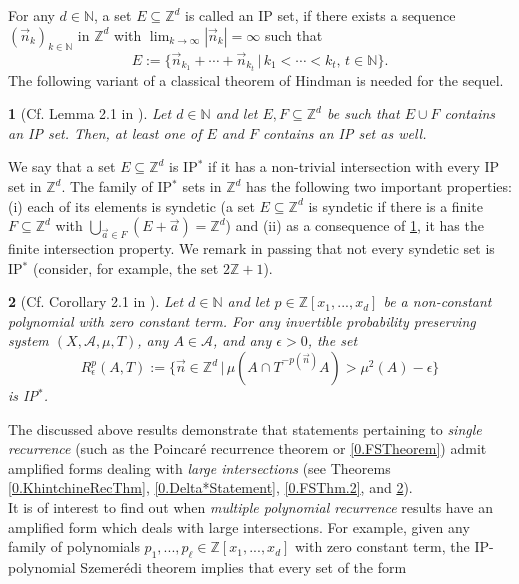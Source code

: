 \documentclass[11pt,american,preprint]{elsarticle}
\numberwithin{equation}{section}
\theoremstyle{plain}
\newtheorem{thm}{\protect\theoremname}[section]
\theoremstyle{plain*}
\theoremstyle{plain}
\theoremstyle{plain*}
\theoremstyle{plain}
\theoremstyle{plain*}
\theoremstyle{remark}
\theoremstyle{remark*}
\theoremstyle{remark}
\theoremstyle{remark*}
\theoremstyle{remark}
\theoremstyle{remark*}
\theoremstyle{plain}
\theoremstyle{definition}
\theoremstyle{plain}
\theoremstyle{plain} %
\providecommand{\theoremname}{Theorem}
\newcommand{\N}{\mathbb{N}}
\newcommand{\Z}{\mathbb{Z}}
\begin{document}
For any $d\in\N$, a set $E\subseteq \Z^d$ is called an IP set, if  there exists a  sequence $(\vec n_k)_{k\in\N}$ in $\Z^d$ with $\lim_{k\rightarrow\infty}|\vec n_k|=\infty$ such that  
$$E:=\{\vec n_{k_1}+\cdots+\vec n_{k_t}\,|\,k_1<\cdots<k_t,\,t\in\N\}.$$
The following variant of a classical theorem of Hindman \cite{HIPPartitionRegular}  is needed for the sequel.
\begin{thm}[Cf. Lemma 2.1 in \cite{BerHi1993AdditiveAndMultiplicative}]\label{0.thm:Hindman}
    Let $d\in\N$ and let $E,F\subseteq \Z^d$ be such that $E\cup F$ contains an IP set. Then, at least one of $E$ and $F$  contains an IP set as well. 
\end{thm}
We say that a set $E\subseteq \Z^d$ is IP$^*$ if it  has a non-trivial intersection with every IP set in $\Z^d$. The family   of IP$^*$ sets in $\Z^d$ has the following two important properties: (i) each of its elements is syndetic (a set $E\subseteq \Z^d$ is syndetic if there is a finite  $F\subseteq\Z^d$ with $\bigcup_{\vec a\in F}(E+\vec a)=\Z^d$) and (ii) as a consequence of \cref{0.thm:Hindman}, it has the finite intersection property. We remark in passing that  not every syndetic set is IP$^*$ (consider, for example, the set $2\Z+1$).
\begin{thm}[Cf. Corollary 2.1 in \cite{BFM}]\label{0.thm:BFM}
    Let $d\in\N$ and let $p\in\Z[x_1,...,x_d]$ be a non-constant polynomial with zero constant term. For any invertible probability preserving system $(X,\mathcal A,\mu,T)$, any $A\in\mathcal A$, and any $\epsilon>0$, the set 
    \begin{equation}
    R_\epsilon^p(A,T):=\{\vec n\in\Z^d\,|\,\mu(A\cap T^{-p(\vec n)}A)>\mu^2(
    A)-\epsilon\}
    \end{equation}
    is \rm{IP$^*$}. 
\end{thm}
The discussed above results demonstrate that statements pertaining to \textit{ single recurrence} (such as the Poincar{\'e} recurrence theorem or \cref{0.FSTheorem})  admit amplified forms dealing with  \textit{large intersections} (see Theorems \ref{0.KhintchineRecThm}, \ref{0.Delta*Statement}, \ref{0.FSThm.2}, and \ref{0.thm:BFM}).\\
It is of interest to find out when \textit{multiple polynomial recurrence} results have an amplified form which deals with large intersections. For example, given  any family of polynomials $p_1,...,p_\ell\in\Z[x_1,...,x_d]$ with zero constant term, the IP-polynomial Szemer{\'e}di theorem \cite{berMcCuIPPolySzemeredi} implies  that every set of the form
\end{document}
